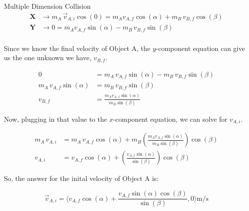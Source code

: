 \begin{example}[]{Multiple Dimension Collision}
  \begin{align*}
    \mathbf{X} &\rightarrow m_{A} \, \vec{v}_{A,i} \cos (0) = m_{A} v_{A,f} \cos (\alpha) + m_{B} \, v_{B,f} \cos (\beta) \\
    \mathbf{Y} &\rightarrow 0 = m_{A} v_{A,f} \sin (\alpha) - m_{B} \, v_{B,f} \sin (\beta) \\
  \end{align*}

  Since we know the final velocity of Object A, the $y$-component equation can give us the one unknown we have, $v_{B,f}$.

  \begin{align*}
    0 &= m_{A} \, v_{A,f} \sin (\alpha) - m_{B} \, v_{B,f} \sin (\beta) \\
    m_{A} \, v_{A,f} \sin (\alpha) &= m_{B} \, v_{B,f} \sin (\beta) \\
    v_{B,f} &= \frac{m_{A}v_{A,f} \sin (\alpha)}{m_{B} \sin (\beta)}
  \end{align*}

  Now, plugging in that value to the $x$-component equation, we can solve for $v_{A,i}$.

  \begin{align*}
    m_{A} \, v_{A,i} &= m_{A} \, v_{A,f} \cos (\alpha) + m_{B} \left( \frac{m_{A}v_{A,f} \sin (\alpha)}{m_{B} \sin (\beta)} \right) \cos (\beta) \\
    v_{A,i} &= v_{A,f} \cos (\alpha) + \left( \frac{v_{A,f} \sin (\alpha)}{\sin (\beta)} \right) \cos (\beta)
  \end{align*}

  So, the answer for the inital velocity of Object A is:

  \begin{equation*}
    \vec{v}_{A,i} = \biggl \langle v_{A,f} \cos (\alpha) + \frac{v_{A,f}\sin (\alpha) \cos (\beta)}{\sin (\beta)}, 0 \biggr \rangle \si{\meter / \second}
  \end{equation*}
\end{example}
